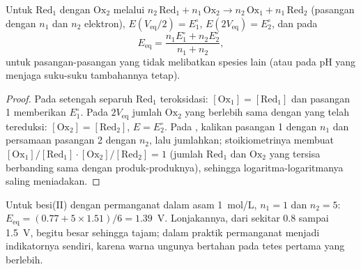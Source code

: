 \begin{proposition}\label{prop:b1:titration-methods:potentiometric-points}
Untuk  $\mathrm{Red_1}$ dengan $\mathrm{Ox_2}$ melalui
$n_2\,\mathrm{Red_1} + n_1\,\mathrm{Ox_2} \to n_2\,\mathrm{Ox_1} +
n_1\,\mathrm{Red_2}$ (pasangan dengan $n_1$ dan $n_2$ elektron), $E(V_{\mathrm{eq}}/2) = E^\circ_1$, $E(2V_{\mathrm{eq}}) =
E^\circ_2$, dan pada 
\[
  E_{\mathrm{eq}} = \frac{n_1E^\circ_1 + n_2E^\circ_2}{n_1 + n_2},
\]
untuk pasangan-pasangan yang  tidak melibatkan spesies
lain (atau pada pH yang menjaga suku-suku tambahannya tetap).
\end{proposition}

\begin{proof}
Pada setengah  separuh $\mathrm{Red_1}$ teroksidasi:
$[\mathrm{Ox_1}] = [\mathrm{Red_1}]$ dan  pasangan 1
memberikan $E^\circ_1$. Pada $2V_{\mathrm{eq}}$ jumlah $\mathrm{Ox_2}$
yang berlebih sama dengan yang telah tereduksi:
$[\mathrm{Ox_2}] = [\mathrm{Red_2}]$, $E = E^\circ_2$. Pada ,
kalikan  pasangan 1 dengan $n_1$ dan persamaan pasangan
2 dengan $n_2$, lalu jumlahkan; stoikiometrinya membuat
$[\mathrm{Ox_1}]/[\mathrm{Red_1}] \cdot [\mathrm{Ox_2}]/[\mathrm{Red_2}] = 1$
(jumlah $\mathrm{Red_1}$ dan $\mathrm{Ox_2}$ yang tersisa berbanding sama
dengan produk-produknya), sehingga logaritma-logaritmanya saling
meniadakan.
\end{proof}

Untuk besi(II) dengan permanganat dalam asam \qty{1}{mol/L}, $n_1 = 1$
dan $n_2 =
5$: $E_{\mathrm{eq}} = (0.77 + 5 \times 1.51)/6 = 1.39$~V. Lonjakannya,
dari sekitar 0.8 sampai 1.5~V, begitu besar sehingga 
tajam; dalam praktik permanganat menjadi indikatornya sendiri, karena
warna ungunya bertahan pada tetes pertama yang berlebih.

